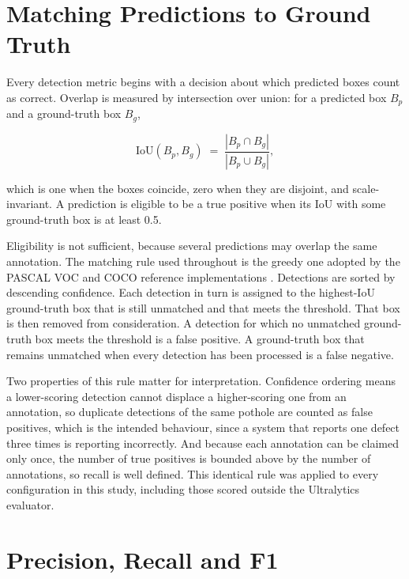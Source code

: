 \documentclass[MScCS]{uccthesis}
\begin{document}
\section{Matching Predictions to Ground Truth}
\label{sec:matching}

Every detection metric begins with a decision about which predicted boxes count
as correct. Overlap is measured by intersection over union: for a predicted box
$B_p$ and a ground-truth box $B_g$,

\begin{equation}
   \mathrm{IoU}(B_p, B_g)
   \;=\; \frac{|B_p \cap B_g|}{|B_p \cup B_g|} ,
   \label{eq:iou}
\end{equation}

which is one when the boxes coincide, zero when they are disjoint, and
scale-invariant. A prediction is eligible to be a true positive when its IoU
with some ground-truth box is at least 0.5.

Eligibility is not sufficient, because several predictions may overlap the same
annotation. The matching rule used throughout is the greedy one adopted by the
PASCAL VOC and COCO reference implementations
\parencite{everingham2010pascal,lin2014microsoft}. Detections are sorted by
descending confidence. Each detection in turn is assigned to the
highest-IoU ground-truth box that is still unmatched and that meets the
threshold. That box is then removed from consideration. A detection for which
no unmatched ground-truth box meets the threshold is a false positive. A
ground-truth box that remains unmatched when every detection has been processed
is a false negative.

Two properties of this rule matter for interpretation. Confidence ordering means
a lower-scoring detection cannot displace a higher-scoring one from an
annotation, so duplicate detections of the same pothole are counted as false
positives, which is the intended behaviour, since a system that reports one
defect three times is reporting incorrectly. And because each annotation can be
claimed only once, the number of true positives is bounded above by the number
of annotations, so recall is well defined. This identical rule was applied to
every configuration in this study, including those scored outside the
Ultralytics evaluator.

\section{Precision, Recall and F1}
\label{sec:prf}
\end{document}
